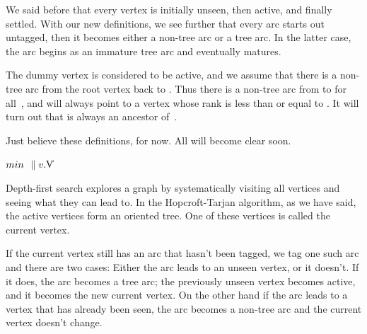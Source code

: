We said before that every vertex is initially unseen, then active, and
finally settled. With our new definitions, we see further that every arc starts
out untagged, then it becomes either a non-tree arc or a tree arc. In the
latter case, the arc begins as an immature tree arc and eventually matures.

The dummy vertex is considered to be active, and we assume that
there is a non-tree arc from the root vertex back to . Thus
there is a non-tree arc from  to  for all~, and 
will always point to a vertex whose rank is less than or equal to
. It will turn out that 
is always an ancestor
of~.

Just believe these definitions, for now. All will become clear soon.

\Y\B\4\D$\\{min}$ \5
$\|v.{}$\|V\par
\fi

Depth-first search explores a graph by systematically visiting all
vertices and seeing what they can lead to. In the Hopcroft-Tarjan algorithm, as
we have said, the active vertices form an oriented tree. One of these
vertices is called the current vertex.

If the current vertex still has an arc that hasn't been tagged, we
tag one such arc and there are two cases: Either the arc leads to
an unseen vertex, or it doesn't. If it does, the arc becomes a tree
arc; the previously unseen vertex becomes active, and it becomes the
new current vertex.  On the other hand if the arc leads to a vertex
that has already been seen, the arc becomes a non-tree arc and the
current vertex doesn't change.

